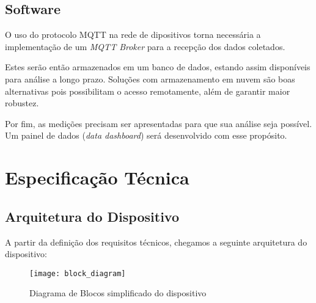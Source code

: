 \documentclass[../monografia.tex]{subfiles}
\begin{document}
\subsection{Software}

O uso do protocolo MQTT na rede de dipositivos torna necessária a implementação de um \textit{MQTT Broker} para a recepção dos dados coletados.

Estes serão então armazenados em um banco de dados, estando assim disponíveis para análise a longo prazo. Soluções com armazenamento em nuvem são boas alternativas pois possibilitam o acesso remotamente, além de garantir maior robustez.

Por fim, as medições precisam ser apresentadas para que sua análise seja possível. Um painel de dados (\textit{data dashboard}) será desenvolvido com esse propósito. 


\section{Especificação Técnica}%

\subsection{Arquitetura do Dispositivo} 
A partir da definição dos requisitos técnicos, chegamos a seguinte arquitetura do dispositivo:

\begin{figure}[h]
    \centering
    \texttt{[image: block\_diagram]}
    \caption{Diagrama de Blocos simplificado do dispositivo}
    \label{fig:Diagrama de Blocos}
\end{figure}
\end{document}
